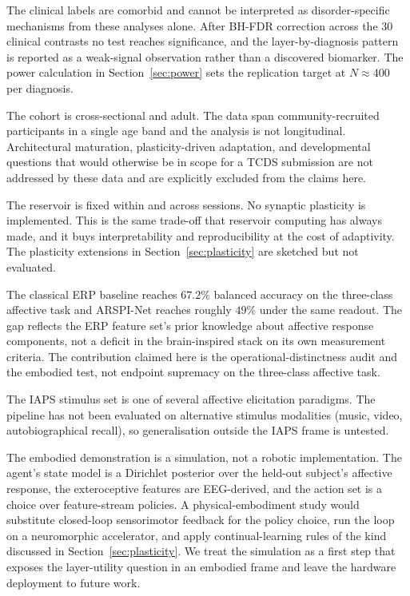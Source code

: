 \documentclass[journal]{IEEEtran}
\begin{document}
The clinical labels are comorbid and cannot be interpreted as disorder-specific mechanisms from these analyses alone. After BH-FDR correction across the 30 clinical contrasts no test reaches significance, and the layer-by-diagnosis pattern is reported as a weak-signal observation rather than a discovered biomarker. The power calculation in Section~\ref{sec:power} sets the replication target at $N\approx 400$ per diagnosis.

The cohort is cross-sectional and adult. The data span community-recruited participants in a single age band and the analysis is not longitudinal. Architectural maturation, plasticity-driven adaptation, and developmental questions that would otherwise be in scope for a TCDS submission are not addressed by these data and are explicitly excluded from the claims here.

The reservoir is fixed within and across sessions. No synaptic plasticity is implemented. This is the same trade-off that reservoir computing has always made, and it buys interpretability and reproducibility at the cost of adaptivity. The plasticity extensions in Section~\ref{sec:plasticity} are sketched but not evaluated.

The classical ERP baseline reaches $67.2\%$ balanced accuracy on the three-class affective task and ARSPI-Net reaches roughly $49\%$ under the same readout. The gap reflects the ERP feature set's prior knowledge about affective response components, not a deficit in the brain-inspired stack on its own measurement criteria. The contribution claimed here is the operational-distinctness audit and the embodied test, not endpoint supremacy on the three-class affective task.

The IAPS stimulus set is one of several affective elicitation paradigms. The pipeline has not been evaluated on alternative stimulus modalities (music, video, autobiographical recall), so generalisation outside the IAPS frame is untested.

The embodied demonstration is a simulation, not a robotic implementation. The agent's state model is a Dirichlet posterior over the held-out subject's affective response, the exteroceptive features are EEG-derived, and the action set is a choice over feature-stream policies. A physical-embodiment study would substitute closed-loop sensorimotor feedback for the policy choice, run the loop on a neuromorphic accelerator, and apply continual-learning rules of the kind discussed in Section~\ref{sec:plasticity}. We treat the simulation as a first step that exposes the layer-utility question in an embodied frame and leave the hardware deployment to future work.
\end{document}
